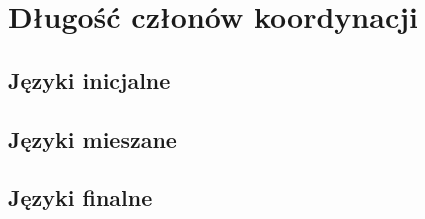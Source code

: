 \chapter{Długość członów koordynacji} \label{dod:tabele}

\section{Języki inicjalne}

\begin{table}[H]
\centering
\resizebox{\linewidth}{!}{

\quad

}
\label{tab:cz+en}
\end{table}

\begin{table}[H]
\centering
\resizebox{\linewidth}{!}{

\quad

}
\label{tab:is+it}
\end{table}

\begin{table}[H]
\centering
\resizebox{\linewidth}{!}{

\quad

}
\label{tab:pl+po}
\end{table}

\begin{table}[H]
\centering
\resizebox{\linewidth}{!}{

\quad

}
\label{tab:ro+ru+es}
\end{table}

\begin{table}[H]
\centering

\label{tab:es}
\end{table}

\section{Języki mieszane}

\begin{table}[H]
\centering
\resizebox{\linewidth}{!}{

\quad

}
\label{tab:de+la}
\end{table}

\section{Języki finalne}

\begin{table}[H]
\centering
\resizebox{\linewidth}{!}{

\quad

}
\label{tab:ko+tr}
\end{table}
